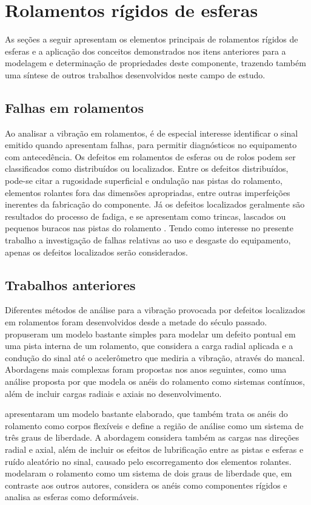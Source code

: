 \documentclass[12pt,oneside,english,brazil,lmodern,siglas,simbolos,cite=num]{ucsmonograph}
\begin{document}
	\section{Rolamentos rígidos de esferas}
	As seções a seguir apresentam os elementos principais de rolamentos rígidos de esferas e a aplicação dos conceitos demonstrados nos itens anteriores para a modelagem e determinação de propriedades deste componente,	trazendo também uma síntese de outros trabalhos desenvolvidos neste campo de estudo.
	
	\subsection{Falhas em rolamentos}
	Ao analisar a vibração em rolamentos, é de especial interesse identificar o sinal emitido quando apresentam falhas, para permitir diagnósticos no equipamento com antecedência.
	Os defeitos em rolamentos de esferas ou de rolos podem ser classificados como distribuídos ou localizados.
	Entre os defeitos distribuídos, pode-se citar a rugosidade superficial e ondulação nas pistas do rolamento, elementos rolantes fora das dimensões apropriadas, entre outras imperfeições inerentes da fabricação do componente.
	Já os defeitos localizados geralmente são resultados do processo de fadiga, e se apresentam como trincas, lascados ou pequenos buracos nas pistas do rolamento \cite{tandon:1997,sassi:2007}.
	Tendo como interesse no presente trabalho a investigação de falhas relativas ao uso e desgaste do equipamento, apenas os defeitos localizados serão considerados.
	
	\subsection{Trabalhos anteriores}
	Diferentes métodos de análise para a vibração provocada por defeitos localizados em rolamentos foram desenvolvidos desde a metade do século passado.
	\citeauthor{mcfadden:1984} propuseram um modelo bastante simples para modelar um defeito pontual em uma pista interna de um rolamento, que considera a carga radial aplicada e a condução do sinal até o acelerômetro que mediria a vibração, através do mancal.
	Abordagens mais complexas foram propostas nos anos seguintes, como uma análise proposta por \citeauthor{tandon:1997} que modela os anéis do rolamento como sistemas contínuos, além de incluir cargas radiais e axiais no desenvolvimento.
	
	\citeauthor{sassi:2007} apresentaram um modelo bastante elaborado, que também trata os anéis do rolamento como corpos flexíveis e define a região de análise como um sistema de três graus de liberdade.
	A abordagem considera também as cargas nas direções radial e axial, além de incluir os efeitos de lubrificação entre as pistas e esferas e ruído aleatório no sinal, causado pelo escorregamento dos elementos rolantes.	\citeauthor{patil:2010} modelaram o rolamento como um sistema de dois graus de liberdade que, em contraste aos outros autores, considera os anéis como componentes rígidos e analisa as esferas como deformáveis.
		
\end{document}

